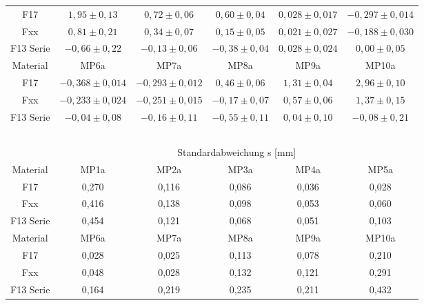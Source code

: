 \documentclass[12pt,a4paper,parskip]{scrartcl}
\begin{document}
{\begin{table}[htbp]
\begin{tabular}{cccccc}
   F17& $ 1,95\pm 0,13 $ & $0,72 \pm 0,06 $ & $0,60 \pm 0,04 $ & $ 0,028 \pm 0,017 $ & $-0,297 \pm 0,014$ \\
    Fxx & $0,81 \pm 0,21 $ & $0,34 \pm 0,07 $ & $0,15 \pm 0,05 $ & $0,021 \pm0,027 $ & $ -0,188\pm0,030$ \\
   F13  Serie & $-0,66 \pm0,22 $ & $-0,13 \pm 0,06 $ & $-0,38 \pm 0,04$ & $ 0,028\pm0,024 $&$0,00 \pm0,05 $ \\
     \bottomrule
     \toprule
  Material   & MP6a & MP7a & MP8a & MP9a & MP10a  \\
  \midrule
      F17&   $-0,368 \pm0,014 $&$-0,293 \pm0,012 $&$ 0,46 \pm 0,06 $&$ 1,31\pm 0,04$&$2,96 \pm0,10 $ \\
Fxx &$-0,233 \pm0,024 $&$-0,251 \pm0,015 $&$-0,17 \pm0,07 $&$0,57 \pm0,06 $&$1,37 \pm0,15 $ \\
  F13 Serie & $-0,04 \pm0,08 $&$ -0,16\pm0,11 $&$-0,55 \pm0,11 $&$0,04 \pm  0,10$&$-0,08 \pm0,21$ \\
     
     \bottomrule
      
     &&&&&\\
     &&&&&\\
     &&&&&\\
     &&&&&\\
     &&&&&\\
     
     \toprule
      & \multicolumn{5}{c}{Standardabweichung s [mm]}\\
   \cmidrule(ll){2-6}
   Material    & MP1a & MP2a & MP3a & MP4a & MP5a \\ 
   \midrule
    F17&0,270&0,116&0,086&0,036&0,028\\
    Fxx &0,416&0,138&0,098&0,053&0,060\\
    F13 Serie&0,454&0,121&0,068&0,051&0,103\\
     \bottomrule
     \toprule
  Material    & MP6a & MP7a & MP8a & MP9a & MP10a  \\
  \midrule
    F17 &0,028&0,025&0,113&0,078&0,210\\
 Fxx   &0,048&0,028&0,132&0,121&0,291\\
F13 Serie &0,164&0,219&0,235&0,211&0,432\\ 
   \bottomrule 
         
   \end{tabular} 
\end{table}

}
\end{document}
